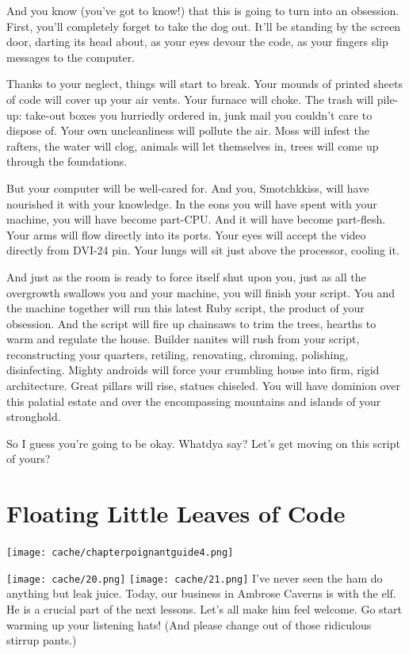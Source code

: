 \documentclass[12pt,twoside]{report}
\begin{document}

And you know (you've got to know!) that this is going to turn into an
obsession.  First, you'll completely forget to take the dog out.
It'll be standing by the screen door, darting its head about, as your
eyes devour the code, as your fingers slip messages to the computer.

Thanks to your neglect, things will start to break.  Your mounds of
printed sheets of code will cover up your air vents.  Your furnace
will choke.  The trash will pile-up: take-out boxes you hurriedly
ordered in, junk mail you couldn't care to dispose of.  Your own
uncleanliness will pollute the air.  Moss will infest the rafters, the
water will clog, animals will let themselves in, trees will come up
through the foundations.

But your computer will be well-cared for.  And you, Smotchkkiss, will
have nourished it with your knowledge. In the eons you will have spent
with your machine, you will have become part-CPU.  And it will have
become part-flesh.  Your arms will flow directly into its ports.  Your
eyes will accept the video directly from DVI-24 pin.  Your lungs will
sit just above the processor, cooling it.

And just as the room is ready to force itself shut upon you, just as
all the overgrowth swallows you and your machine, you will finish your
script.  You and the machine together will run this latest Ruby
script, the product of your obsession.  And the script will fire up
chainsaws to trim the trees, hearths to warm and regulate the house.
Builder nanites will rush from your script, reconstructing your
quarters, retiling, renovating, chroming, polishing, disinfecting.
Mighty androids will force your crumbling house into firm, rigid
architecture.  Great pillars will rise, statues chiseled.  You will
have dominion over this palatial estate and over the encompassing
mountains and islands of your stronghold.

So I guess you're going to be okay.  Whatdya say?  Let's get moving on
this script of yours?
\newpage
\thispagestyle{empty}
\mbox{}

\cleartooddpage


\chapter{Floating Little Leaves of Code}
\vfill
\begin{center}
  \texttt{[image: cache/chapterpoignantguide4.png]}
\end{center}
\vspace{4.6cm}
\newpage
\thispagestyle{empty}
\mbox{}
\clearpage
	\texttt{[image: cache/20.png]}
        \texttt{[image: cache/21.png]}
\clearpage
I've never seen the ham do anything but leak juice.  Today, our
business in Ambrose Caverns is with the elf.  He is a crucial part of
the next lessons. Let's all make him feel welcome. Go start warming up
your listening hats!  (And please change out of those ridiculous
stirrup pants.)
\end{document}
